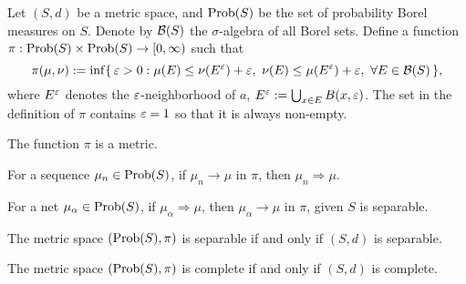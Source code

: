 \documentclass[10pt]{article}
\begin{document}
\begin{thm}
Let $(S,d)$ be a metric space, and $\operatorname{Prob}(S)$ be the set of probability Borel measures on $S$.
Denote by $\mathcal{B}(S)$ the $\sigma$-algebra of all Borel sets.
Define a function $\pi:\operatorname{Prob}(S)\times\operatorname{Prob}(S)\to[0,\infty)$ such that
\[\pi(\mu,\nu):=\inf\{\,\e>0:\mu(E)\le\nu(E^\e)+\e,\ \nu(E)\le\mu(E^\e)+\e,\ \forall E\in\cB(S)\,\},\]
where $E^\varepsilon$ denotes the $\varepsilon$-neighborhood of $a$, $E^\varepsilon:=\bigcup_{x\in E}B(x,\varepsilon)$.
The set in the definition of $\pi$ contains $\varepsilon=1$ so that it is always non-empty.
\begin{parts}
\item The function $\pi$ is a metric.
\item For a sequence $\mu_n\in\operatorname{Prob}(S)$, if $\mu_n\to\mu$ in $\pi$, then $\mu_n\Rightarrow\mu$.
\item For a net $\mu_\alpha\in\operatorname{Prob}(S)$, if $\mu_\alpha\Rightarrow\mu$, then $\mu_\alpha\to\mu$ in $\pi$, given $S$ is separable.
\item The metric space $(\operatorname{Prob}(S),\pi)$ is separable if and only if $(S,d)$ is separable.
\item The metric space $(\operatorname{Prob}(S),\pi)$ is complete if and only if $(S,d)$ is complete.
\end{parts}
\end{thm}
\end{document}

